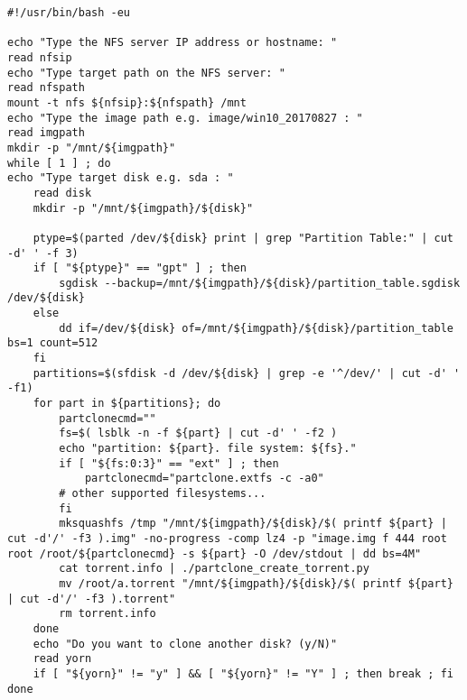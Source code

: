 \begin{minipage}{\textwidth}
\begin{lstlisting}[label={bitatom},caption= The Shell Script of BitAtom]
#!/usr/bin/bash -eu

echo "Type the NFS server IP address or hostname: "
read nfsip
echo "Type target path on the NFS server: "
read nfspath
mount -t nfs ${nfsip}:${nfspath} /mnt
echo "Type the image path e.g. image/win10_20170827 : "
read imgpath
mkdir -p "/mnt/${imgpath}"
while [ 1 ] ; do
echo "Type target disk e.g. sda : "
	read disk
	mkdir -p "/mnt/${imgpath}/${disk}"

	ptype=$(parted /dev/${disk} print | grep "Partition Table:" | cut -d' ' -f 3)
	if [ "${ptype}" == "gpt" ] ; then
		sgdisk --backup=/mnt/${imgpath}/${disk}/partition_table.sgdisk /dev/${disk}
	else
		dd if=/dev/${disk} of=/mnt/${imgpath}/${disk}/partition_table bs=1 count=512
	fi
	partitions=$(sfdisk -d /dev/${disk} | grep -e '^/dev/' | cut -d' ' -f1)
	for part in ${partitions}; do
		partclonecmd=""
		fs=$( lsblk -n -f ${part} | cut -d' ' -f2 )
		echo "partition: ${part}. file system: ${fs}."
		if [ "${fs:0:3}" == "ext" ] ; then
			partclonecmd="partclone.extfs -c -a0" 
		# other supported filesystems...
		fi
		mksquashfs /tmp "/mnt/${imgpath}/${disk}/$( printf ${part} | cut -d'/' -f3 ).img" -no-progress -comp lz4 -p "image.img f 444 root root /root/${partclonecmd} -s ${part} -O /dev/stdout | dd bs=4M"
		cat torrent.info | ./partclone_create_torrent.py
		mv /root/a.torrent "/mnt/${imgpath}/${disk}/$( printf ${part} | cut -d'/' -f3 ).torrent"
		rm torrent.info
	done
	echo "Do you want to clone another disk? (y/N)"
	read yorn
	if [ "${yorn}" != "y" ] && [ "${yorn}" != "Y" ] ; then break ; fi
done
\end{lstlisting}
\end{minipage}
